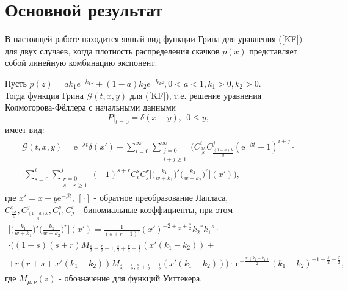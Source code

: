 \section{Основной результат}
В настоящей работе находится явный вид функции Грина для уравнения (\ref{KF}) для двух случаев, когда плотность распределения скачков $p(x)$ представляет собой линейную комбинацию экспонент.
\begin{theorem}
Пусть $p(z)=a k_1 e^{-k_1 z} +(1-a) k_2 e^{-k_2 z}, 0<a<1, k_1>0, k_2>0$.\\
Тогда функция Грина $\mathcal{G}(t,x,y)$ для (\ref{KF}), т.е. решение уравнения Колмогорова-Фёллера с начальными данными
\begin{equation}\label{init}
    P|_{t=0}=\delta(x-y),\ \  0 \le y,
\end{equation}
    имеет вид:
  \begin{equation}\label{green}
  \begin{gathered}
    \mathcal{G}(t,x,y)=\mathrm{e}^{-\lambda t} \delta(x')
    +\sum\limits_{i=0}^{\infty}\sum\limits_{
    \substack{j=0\\i+j\ge 1}}^{\infty}
    \bigg( C_{\frac{a \lambda}{\beta}}^i
    C_{\frac{(1-a) \lambda}{\beta}}^j
    (\mathrm{e}^{-\beta t}-1)^{i+j} \cdot\\
    \cdot \sum\limits_{s=0}^{i}
    \sum\limits_{\substack{r=0\\s+r\ge 1}}^{j}
    (-1)^{s+r}
    C_i^s C_j^r
    \Big[\Big(\frac{k_1}{w+k_1}\Big)^s   \Big(\frac{k_2}{w+k_2}\Big)^r \Big](x') \bigg),
  \end{gathered}
\end{equation}
где $x'=x - y\mathrm{e}^{-\beta t}$, $[\cdot]$ - обратное преобразование Лапласа,\\
$C_{\frac{a \lambda}{\beta}}^i,
C_{\frac{(1-a) \lambda}{\beta}}^j,
C_i^s, C_j^r$ - биномиальные коэффициенты,
при этом
\begin{equation}
\begin{gathered}
    \Big[\Big(\frac{k_1}{w+k_1}\Big)^s   \Big(\frac{k_2}{w+k_2}\Big)^r \Big](x')=\frac{1}{(s+r+1)!}
    (x')^{-2+\frac{r}{2}+\frac{s}{2}} {k_2}^{r} {k_1}^{s} \cdot \\
    \cdot
    \Big(\left(1+s \right) \left(s +r \right) M_{\frac{s}{2}-\frac{r}{2}+1,\frac{s}{2}+\frac{r}{2}+\frac{1}{2}}\! \left(x' \left({k_1} -{k_2} \right)\right) + \\
    + r \left(r +s +x' \left({k_1} -{k_2} \right)\right)M_{\frac{s}{2}-\frac{r}{2},\frac{s}{2}+\frac{r}{2}+\frac{1}{2}}\! \left(x' \left({k_1} -{k_2} \right)\right)\bigg) \cdot \ {\mathrm e}^{-\frac{x' \left({k_2} +{k_1} \right)}{2}} \left({k_1} -{k_2} \right)^{-1-\frac{s}{2}-\frac{r}{2}},
\end{gathered}
\end{equation}
     где
     $M_{\mu,\nu}(z)$ - обозначение для функций Уиттекера.
\end{theorem}

